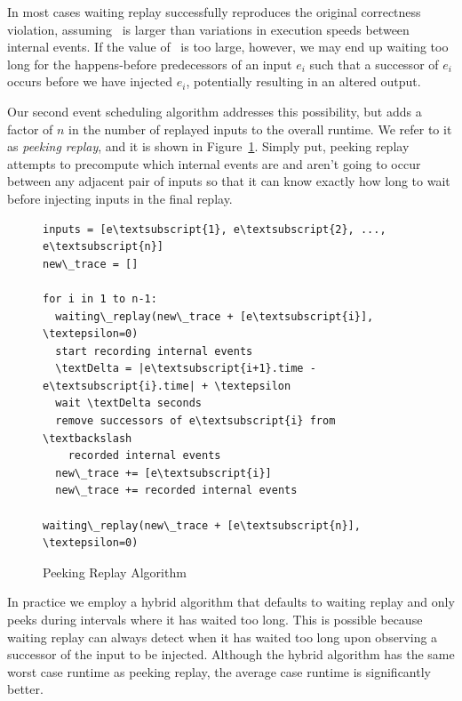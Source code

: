 In most cases waiting replay successfully reproduces the original correctness
violation, assuming \textepsilon~is larger than variations in execution speeds
between internal events. If the value of \textepsilon~is too large, however, we may end up
waiting too long for the happens-before predecessors of an input $e_i$ such that a
successor of $e_i$ occurs before we have injected $e_i$,
potentially resulting in an altered output.

Our second event scheduling algorithm addresses this possibility, but
adds a factor of $n$ in the number of replayed inputs to the overall
runtime. We refer to it as \emph{peeking replay}, and it is shown in Figure~\ref{fig:peek}.
Simply put, peeking replay
attempts to precompute which internal events are and aren't going to occur
between any adjacent pair of inputs
so that it can know exactly how long to wait before injecting inputs in the
final replay.

\begin{figure}
\begin{boxedminipage}{\linewidth}
\begin{Verbatim}[commandchars=\\\{\}]
inputs = [e\textsubscript{1}, e\textsubscript{2}, ..., e\textsubscript{n}]
new\_trace = []

for i in 1 to n-1:
  waiting\_replay(new\_trace + [e\textsubscript{i}], \textepsilon=0)
  start recording internal events
  \textDelta = |e\textsubscript{i+1}.time - e\textsubscript{i}.time| + \textepsilon
  wait \textDelta seconds
  remove successors of e\textsubscript{i} from \textbackslash
    recorded internal events
  new\_trace += [e\textsubscript{i}]
  new\_trace += recorded internal events

waiting\_replay(new\_trace + [e\textsubscript{n}], \textepsilon=0)
\end{Verbatim}
\end{boxedminipage}
\caption{Peeking Replay Algorithm}
\label{fig:peek}
\end{figure}

In practice we employ a hybrid algorithm
that defaults to waiting replay and only
peeks during intervals where it has waited too long.
This is possible because waiting replay can always detect when it has
waited too long upon observing a successor of the input to be injected.
Although the hybrid algorithm has the same worst case runtime as peeking
replay, the average case runtime is significantly better.

